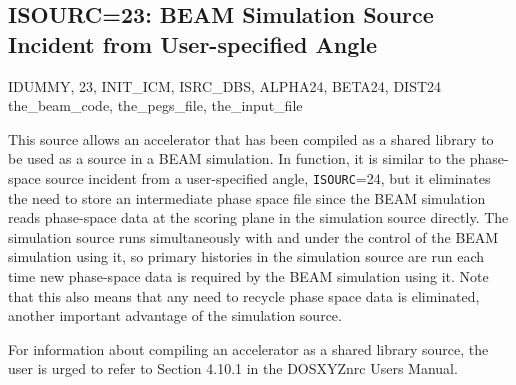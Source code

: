 \documentclass[12pt,twoside]{article}
\newcommand{\cen}[1]{\begin{center} #1 \end{center}                   }
\begin{document}
\clearpage

\subsection{ISOURC=23: BEAM Simulation Source Incident from User-specified Angle}
\label{Source23}

\cen{IDUMMY, 23, INIT\_ICM, ISRC\_DBS, ALPHA24, BETA24, DIST24\\
the\_beam\_code, the\_pegs\_file, the\_input\_file}

This source allows an accelerator that has been compiled as a shared library to
be used as a source in a BEAM simulation.  In function, it is similar to
the phase-space source incident from a user-specified angle, {\tt ISOURC}=24,
but it eliminates the need to store an
intermediate phase space file since the BEAM simulation reads phase-space data at the
scoring plane in
the simulation source directly.  The simulation source runs simultaneously with
and under the control of the BEAM simulation using it, so primary histories in the
simulation source are run each time new phase-space data is required by the
BEAM simulation using it.  Note that this also means that any need to recycle phase
space data is eliminated, another important advantage of the simulation source.

 For information about compiling an accelerator as a shared
library source, the user is urged to refer to Section 4.10.1 in the DOSXYZnrc Users Manual\cite{Wa05}.
\end{document}
